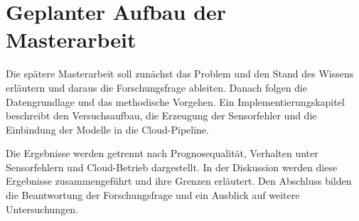 

\section{Geplanter Aufbau der Masterarbeit}

Die spätere Masterarbeit soll zunächst das Problem und den Stand des Wissens erläutern und daraus die Forschungsfrage ableiten. Danach folgen die Datengrundlage und das methodische Vorgehen. Ein Implementierungskapitel beschreibt den Versuchsaufbau, die Erzeugung der Sensorfehler und die Einbindung der Modelle in die Cloud-Pipeline.

Die Ergebnisse werden getrennt nach Prognosequalität, Verhalten unter Sensorfehlern und Cloud-Betrieb dargestellt. In der Diskussion werden diese Ergebnisse zusammengeführt und ihre Grenzen erläutert. Den Abschluss bilden die Beantwortung der Forschungsfrage und ein Ausblick auf weitere Untersuchungen.
